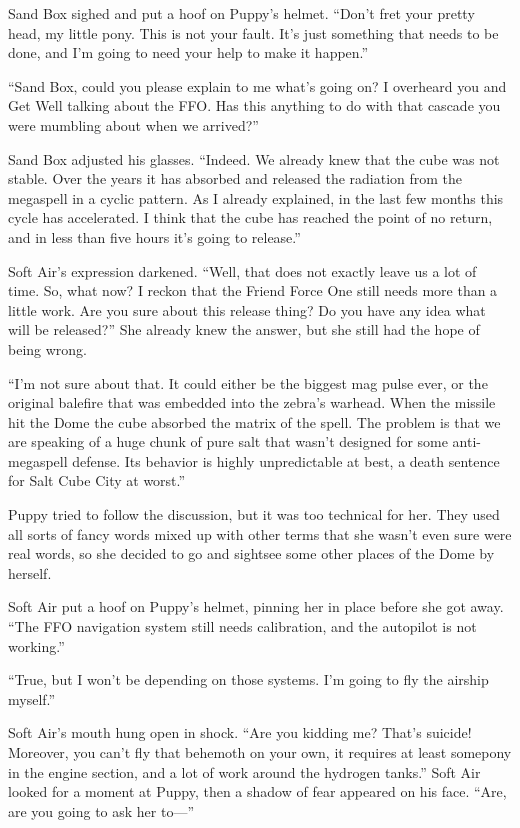 Sand Box sighed and put a hoof on Puppy's helmet. ``Don't fret your pretty head, my little pony. This is not your fault. It's just something that needs to be done, and I'm going to need your help to make it happen.''

``Sand Box, could you please explain to me what's going on? I overheard you and Get Well talking about the FFO. Has this anything to do with that cascade you were mumbling about when we arrived?''

Sand Box adjusted his glasses. ``Indeed. We already knew that the cube was not stable. Over the years it has absorbed and released the radiation from the megaspell in a cyclic pattern. As I already explained, in the last few months this cycle has accelerated. I think that the cube has reached the point of no return, and in less than five hours it's going to release.''

Soft Air's expression darkened. ``Well, that does not exactly leave us a lot of time. So, what now? I reckon that the Friend Force One still needs more than a little work. Are you sure about this release thing? Do you have any idea what will be released?'' She already knew the answer, but she still had the hope of being wrong.

``I'm not sure about that. It could either be the biggest mag pulse ever, or the original balefire that was embedded into the zebra's warhead. When the missile hit the Dome the cube absorbed the matrix of the spell. The problem is that we are speaking of a huge chunk of pure salt that wasn't designed for some anti-megaspell defense. Its behavior is highly unpredictable at best, a death sentence for Salt Cube City at worst.''

Puppy tried to follow the discussion, but it was too technical for her. They used all sorts of fancy words mixed up with other terms that she wasn't even sure were real words, so she decided to go and sightsee some other places of the Dome by herself.

Soft Air put a hoof on Puppy's helmet, pinning her in place before she got away. ``The FFO navigation system still needs calibration, and the autopilot is not working.''

``True, but I won't be depending on those systems. I'm going to fly the airship myself.''

Soft Air's mouth hung open in shock. ``Are you kidding me? That's suicide! Moreover, you can't fly that behemoth on your own, it requires at least somepony in the engine section, and a lot of work around the hydrogen tanks.'' Soft Air looked for a moment at Puppy, then a shadow of fear appeared on his face. ``Are, are you going to ask her to---''

